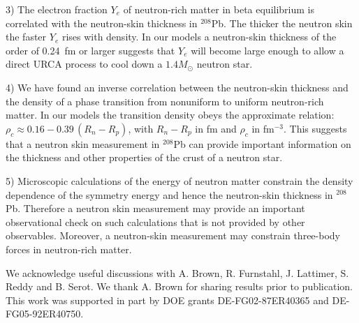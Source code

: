 3) The electron fraction $Y_e$ of neutron-rich matter in beta 
equilibrium is correlated with the neutron-skin thickness in 
$^{208}$Pb. The thicker the neutron skin the faster $Y_e$ rises with 
density. In our models a neutron-skin thickness of the order of
0.24~fm or larger suggests that $Y_e$ will become large enough to 
allow a direct URCA process to cool down a $1.4 M_{\odot}$ neutron 
star.

4) We have found an inverse correlation between the 
neutron-skin thickness and the density of a phase transition 
from nonuniform to uniform neutron-rich matter. In our models 
the transition density obeys the approximate relation: 
$\rho_c\approx 0.16 -0.39\,(R_n\!-\!R_p)$, with $R_n\!-\!R_p$ 
in fm and $\rho_c$ in fm$^{-3}$. This suggests that a neutron 
skin measurement in $^{208}$Pb can provide important information 
on the thickness and other properties of the crust of a neutron 
star.

5) Microscopic calculations of the energy of neutron matter 
constrain the density dependence of the symmetry energy and hence 
the neutron-skin thickness in $^{208}$Pb. Therefore a neutron skin 
measurement may provide an important observational check on such 
calculations that is not provided by other observables. Moreover, 
a neutron-skin measurement may constrain three-body forces in 
neutron-rich matter.

\smallskip
We acknowledge useful discussions with A. Brown, R. Furnstahl,
J. Lattimer, S. Reddy and B. Serot.  We thank A. Brown for sharing
results prior to publication.  This work was supported in part by DOE
grants DE-FG02-87ER40365 and DE-FG05-92ER40750.

